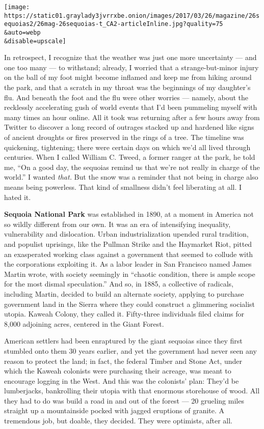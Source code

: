 \texttt{[image: https://static01.graylady3jvrrxbe.onion/images/2017/03/26/magazine/26sequoias2/26mag-26sequoias-t\_CA2-articleInline.jpg?quality=75\\\&auto=webp\\\&disable=upscale]}

In retrospect, I recognize that the weather was just one more
uncertainty --- and one too many --- to withstand; already, I worried
that a strange-but-minor injury on the ball of my foot might become
inflamed and keep me from hiking around the park, and that a scratch in
my throat was the beginnings of my daughter's flu. And beneath the foot
and the flu were other worries --- namely, about the recklessly
accelerating gush of world events that I'd been pummeling myself with
many times an hour online. All it took was returning after a few hours
away from Twitter to discover a long record of outrages stacked up and
hardened like signs of ancient droughts or fires preserved in the rings
of a tree. The timeline was quickening, tightening; there were certain
days on which we'd all lived through centuries. When I called William C.
Tweed, a former ranger at the park, he told me, ``On a good day, the
sequoias remind us that we're not really in charge of the world.'' I
wanted \emph{that.} But the snow was a reminder that not being in charge
also means being powerless. That kind of smallness didn't feel
liberating at all. I hated it.

\textbf{Sequoia National Park} was established in 1890, at a moment in
America not so wildly different from our own. It was an era of
intensifying inequality, vulnerability and dislocation. Urban
industrialization upended rural tradition, and populist uprisings, like
the Pullman Strike and the Haymarket Riot, pitted an exasperated working
class against a government that seemed to collude with the corporations
exploiting it. As a labor leader in San Francisco named James Martin
wrote, with society seemingly in ``chaotic condition, there is ample
scope for the most dismal speculation.'' And so, in 1885, a collective
of radicals, including Martin, decided to build an alternate society,
applying to purchase government land in the Sierra where they could
construct a glimmering socialist utopia. Kaweah Colony, they called it.
Fifty-three individuals filed claims for 8,000 adjoining acres, centered
in the Giant Forest.

American settlers had been enraptured by the giant sequoias since they
first stumbled onto them 30 years earlier, and yet the government had
never seen any reason to protect the land; in fact, the federal Timber
and Stone Act, under which the Kaweah colonists were purchasing their
acreage, was meant to encourage logging in the West. And this was the
colonists' plan: They'd be lumberjacks, bankrolling their utopia with
that enormous storehouse of wood. All they had to do was build a road in
and out of the forest --- 20 grueling miles straight up a mountainside
pocked with jagged eruptions of granite. A tremendous job, but doable,
they decided. They were optimists, after all.

